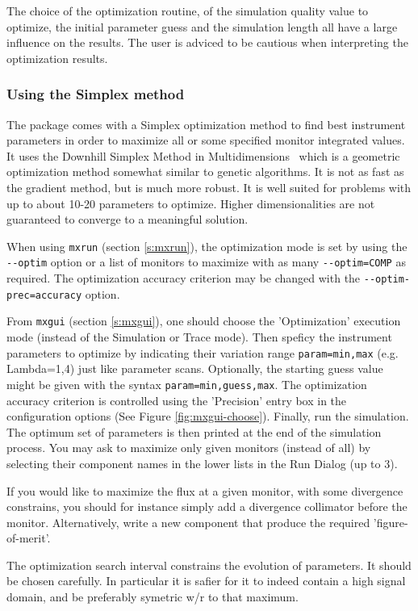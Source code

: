 The choice of the optimization routine, of the simulation quality
value to optimize, the initial parameter guess and the simulation
length all have a large influence on the results.
The user is adviced to be cautious when interpreting the optimization results.

\subsubsection{Using the Simplex method}

The \MCX package comes with a Simplex optimization method to find best
instrument parameters in order to maximize all or some specified monitor
integrated values. It uses the Downhill Simplex Method in
Multidimensions~\cite{neldermead,NumRecip} which is a geometric optimization
method somewhat similar to genetic algorithms. It is not as fast as the
gradient method, but is much more robust. It is well suited for problems with
up to about 10-20 parameters to optimize. Higher dimensionalities are not
guaranteed to converge to a meaningful solution.

When using \verb+mxrun+ (section \ref{s:mxrun}), the optimization mode is set by using the
\verb+--optim+ option or a list of monitors to maximize with as many
\verb+--optim=COMP+ as required. The optimization accuracy criterion
may be changed with the \verb+--optim-prec=accuracy+ option.

From \verb+mxgui+ (section \ref{s:mxgui}), one should choose the
'Optimization' execution mode (instead of the Simulation or Trace
mode). Then speficy the instrument parameters to optimize by
indicating their variation range \verb+param=min,max+ (e.g. Lambda=1,4) just like
parameter scans. Optionally, the starting guess value might be given with the syntax \verb+param=min,guess,max+. The optimization accuracy criterion is controlled
using the 'Precision' entry box in the configuration options (See
Figure \ref{fig:mxgui-choose}). Finally, run the simulation. The optimum
set of parameters is then printed at the end of the simulation
process. You may ask to maximize only given monitors (instead of all)
by selecting their component names in the lower lists in the Run Dialog (up to 3).

If you would like to maximize the flux at a given monitor, with some
divergence constrains, you should for instance simply add a divergence
collimator before the monitor. Alternatively, write a new component
that produce the required 'figure-of-merit'.

The optimization search interval constrains the evolution of parameters. It should be chosen carefully. In particular it is safier for it to indeed contain a high signal domain, and be preferably symetric w/r to that maximum.

